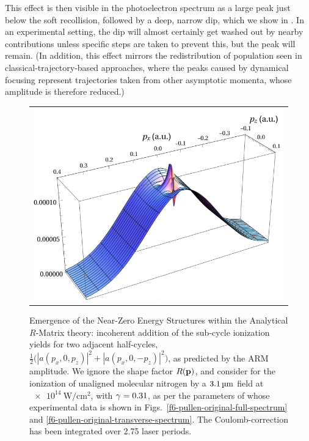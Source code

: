 This effect is then visible in the photoelectron spectrum as a large peak just below the soft recollision, followed by a deep, narrow dip, which we show in . In an experimental setting, the dip will almost certainly get washed out by nearby contributions unless specific steps are taken to prevent this, but the peak will remain. (In addition, this effect mirrors the redistribution of population seen in classical-trajectory-based approaches, where the peaks caused by dynamical focusing represent trajectories taken from other asymptotic momenta, whose amplitude is therefore reduced.)



\begin{figure}[htb]
  \centering
  \begin{tabular}{c}
    \includegraphics[width=0.7\columnwidth]{6-LES/Figures/figure6-2B.pdf}
  \end{tabular}
  \caption[
  ARM photoelectron spectra showing Near-Zero Energy Structures
  ]{
  Emergence of the Near-Zero Energy Structures within the Analytical $R$-Matrix theory: incoherent addition of the sub-cycle ionization yields for two adjacent half-cycles, $\tfrac12\big(\left|a(p_x,0,p_z)\right|^2+\left|a(p_x,0,-p_z)\right|^2\big)$, as predicted by the ARM amplitude.
  We ignore the shape factor $R(\vb{p})$, and consider for the ionization of unaligned molecular nitrogen by a $\SI{3.1}{\micro\meter}$ field at $\SI{e14}{\watt/\centi\meter^2}$, with $\gamma=0.31$, as per the parameters of  whose experimental data is shown in Figs.~\ref{f6-pullen-original-full-spectrum} and \ref{f6-pullen-original-transverse-spectrum}. The Coulomb-correction has been integrated over 2.75 laser periods. 
  }
  \label{f6-po-pp-spectrum}
\end{figure}


